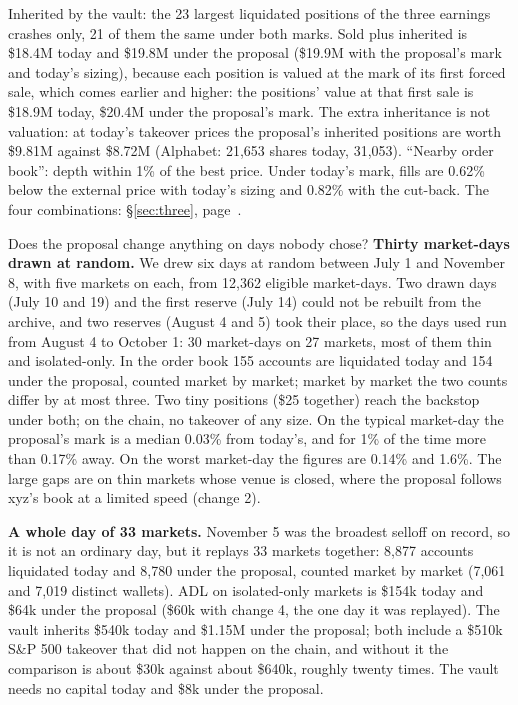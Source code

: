 \foot
\begin{exact}[Sources]
Inherited by the vault: the 23 largest liquidated positions of the three earnings crashes only, 21 of them the same under both marks. Sold plus inherited is \$18.4M today and \$19.8M under the proposal (\$19.9M with the proposal's mark and today's sizing), because each position is valued at the mark of its first forced sale, which comes earlier and higher: the positions' value at that first sale is \$18.9M today, \$20.4M under the proposal's mark. The extra inheritance is not valuation: at today's takeover prices the proposal's inherited positions are worth \$9.81M against \$8.72M (Alphabet: 21{,}653 shares today, 31{,}053). ``Nearby order book'': depth within 1\% of the best price. Under today's mark, fills are 0.62\% below the external price with today's sizing and 0.82\% with the cut-back. The four combinations: \S\ref{sec:three}, page~\pageref{sec:three}.
\end{exact}

\label{sec:users}

Does the proposal change anything on days nobody chose? \textbf{Thirty market-days drawn at random.} We drew six days at random between July 1 and November 8, with five markets on each, from 12{,}362 eligible market-days. Two drawn days (July 10 and 19) and the first reserve (July 14) could not be rebuilt from the archive, and two reserves (August 4 and 5) took their place, so the days used run from August 4 to October 1: 30 market-days on 27 markets, most of them thin and isolated-only. In the order book 155 accounts are liquidated today and 154 under the proposal, counted market by market; market by market the two counts differ by at most three. Two tiny positions (\$25 together) reach the backstop under both; on the chain, no takeover of any size. On the typical market-day the proposal's mark is a median 0.03\% from today's, and for 1\% of the time more than 0.17\% away. On the worst market-day the figures are 0.14\% and 1.6\%. The large gaps are on thin markets whose venue is closed, where the proposal follows xyz's book at a limited speed (change 2).

\textbf{A whole day of 33 markets.} November 5 was the broadest selloff on record, so it is not an ordinary day, but it replays 33 markets together: 8{,}877 accounts liquidated today and 8{,}780 under the proposal, counted market by market (7{,}061 and 7{,}019 distinct wallets). ADL on isolated-only markets is \$154k today and \$64k under the proposal (\$60k with change 4, the one day it was replayed). The vault inherits \$540k today and \$1.15M under the proposal; both include a \$510k S\&P 500 takeover that did not happen on the chain, and without it the comparison is about \$30k against about \$640k, roughly twenty times. The vault needs no capital today and \$8k under the proposal.

